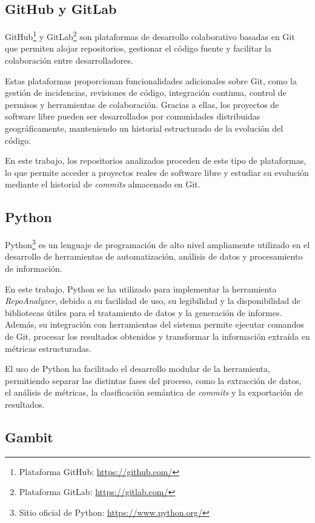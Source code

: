 \documentclass[a4paper, 12pt]{book}
\begin{document}
\subsection{GitHub y GitLab}
\label{subsec:github_gitlab}

GitHub\footnote{Plataforma GitHub: \url{https://github.com/}} y GitLab\footnote{Plataforma GitLab: \url{https://gitlab.com/}} son plataformas de desarrollo colaborativo basadas en Git que permiten alojar repositorios, gestionar el código fuente y facilitar la colaboración entre desarrolladores.

Estas plataformas proporcionan funcionalidades adicionales sobre Git, como la gestión de incidencias, revisiones de código, integración continua, control de permisos y herramientas de colaboración. Gracias a ellas, los proyectos de software libre pueden ser desarrollados por comunidades distribuidas geográficamente, manteniendo un historial estructurado de la evolución del código.

En este trabajo, los repositorios analizados proceden de este tipo de plataformas, lo que permite acceder a proyectos reales de software libre y estudiar su evolución mediante el historial de \emph{commits} almacenado en Git.

\subsection{Python}
\label{subsec:python}

Python\footnote{Sitio oficial de Python: \url{https://www.python.org/}} es un lenguaje de programación de alto nivel ampliamente utilizado en el desarrollo de herramientas de automatización, análisis de datos y procesamiento de información.

En este trabajo, Python se ha utilizado para implementar la herramienta \emph{RepoAnalyzer}, debido a su facilidad de uso, su legibilidad y la disponibilidad de bibliotecas útiles para el tratamiento de datos y la generación de informes. Además, su integración con herramientas del sistema permite ejecutar comandos de Git, procesar los resultados obtenidos y transformar la información extraída en métricas estructuradas.

El uso de Python ha facilitado el desarrollo modular de la herramienta, permitiendo separar las distintas fases del proceso, como la extracción de datos, el análisis de métricas, la clasificación semántica de \emph{commits} y la exportación de resultados.

\subsection{Gambit}
\label{subsec:gambit}
\end{document}
